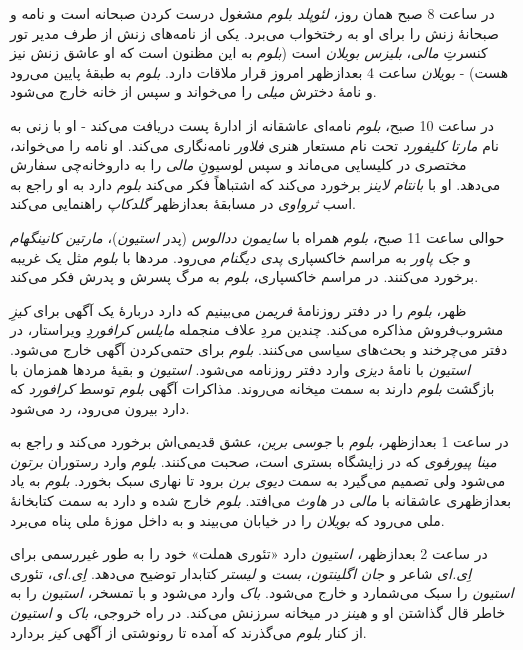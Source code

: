 \documentclass[12pt]{book}
\newcommand{\noun}[1]{\textit{\textcolor{black!70}{#1}}}
\begin{document}
    در ساعت 8 صبح همان روز، \noun{لئوپلد بلوم} مشغول درست کردن صبحانه است و نامه و صبحانۀ زنش را برای او به رختخواب می‌برد. یکی از نامه‌های زنش از طرف مدیر تور کنسرتِ \noun{مالی}، \noun{بلیزس بویلان} است (\noun{بلوم} به این مظنون است که او عاشق زنش نیز هست) - \noun{بویلان} ساعت 4 بعدازظهر امروز قرار ملاقات دارد. \noun{بلوم} به طبقۀ پایین می‌رود و نامۀ دخترش \noun{میلی} را می‌خواند و سپس از خانه خارج می‌شود.

    در ساعت 10 صبح، \noun{بلوم} نامه‌ای عاشقانه از ادارۀ پست دریافت می‌کند - او با زنی به نام \noun{مارتا کلیفورد} تحت نام مستعار هنری \noun{فلاور} نامه‌نگاری می‌کند. او نامه را می‌خواند، مختصری در کلیسایی می‌ماند و سپس لوسیونِ \noun{مالی} را به داروخانه‌چی سفارش می‌دهد. او با \noun{بانتام لاینز} برخورد می‌کند که اشتباهاً فکر می‌کند \noun{بلوم} دارد به او راجع به اسب \noun{ثرواوی} در مسابقۀ بعدازظهر \noun{گلدکاپ} راهنمایی می‌کند.

    حوالی ساعت 11 صبح، \noun{بلوم} همراه با \noun{سایمون ددالوس} (پدر \noun{استیون})، \noun{مارتین کانینگهام} و \noun{جک پاور} به مراسم خاکسپاری \noun{پدی دیگنام} می‌رود. مردها با \noun{بلوم} مثل یک غریبه برخورد می‌کنند. در مراسم خاکسپاری، \noun{بلوم} به مرگ پسرش و پدرش فکر می‌کند.

    ظهر، \noun{بلوم} را در دفتر روزنامۀ \noun{فریمن} می‌بینیم که دارد دربارۀ یک آگهی برای \noun{کیزِ} مشروب‌فروش مذاکره می‌کند. چندین مردِ علاف منجمله \noun{مایلس کرافوردِ} ویراستار، در دفتر می‌چرخند و بحث‌های سیاسی می‌کنند. \noun{بلوم} برای حتمی‌کردن آگهی خارج می‌شود. \noun{استیون} با نامۀ \noun{دیزی} وارد دفتر روزنامه می‌شود. \noun{استیون} و بقیۀ مردها همزمان با بازگشت \noun{بلوم} دارند به سمت میخانه می‌روند. مذاکرات آگهی \noun{بلوم} توسط \noun{کرافورد} که دارد بیرون می‌رود، رد می‌شود.

    در ساعت 1 بعدازظهر، \noun{بلوم} با \noun{جوسی برین}، عشق قدیمی‌اش برخورد می‌کند و راجع به \noun{مینا پیورفوی} که در زایشگاه بستری است، صحبت می‌کنند. \noun{بلوم} وارد رستوران \noun{برتون} می‌شود ولی تصمیم می‌گیرد به سمت \noun{دیوی برن} برود تا نهاری سبک بخورد. \noun{بلوم} به یاد بعدازظهری عاشقانه با \noun{مالی} در \noun{هاوث} می‌افتد. \noun{بلوم} خارج شده و دارد به سمت کتابخانۀ ملی می‌رود که \noun{بویلان} را در خیابان می‌بیند و به داخل موزۀ ملی پناه می‌برد.

    در ساعت 2 بعدازظهر، \noun{استیون} دارد «تئوری هملت» خود را به طور غیررسمی برای \noun{اِی.ای} شاعر و \noun{جان اگلینتون}، \noun{بست} و \noun{لیستر} کتابدار توضیح می‌دهد. \noun{اِی.ای}، تئوری \noun{استیون} را سبک می‌شمارد و خارج می‌شود. \noun{باک} وارد می‌شود و با تمسخر، \noun{استیون} را به خاطر قال گذاشتن او و \noun{هینز} در میخانه سرزنش می‌کند. در راه خروجی، \noun{باک} و \noun{استیون} از کنار \noun{بلوم} می‌گذرند که آمده تا رونوشتی از آگهی \noun{کیز} بردارد.
\end{document}
